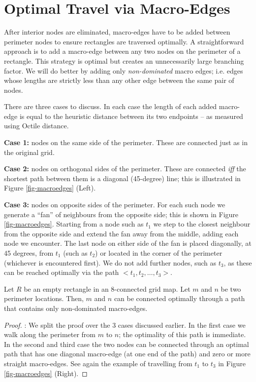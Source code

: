 \section{Optimal Travel via Macro-Edges}

After interior nodes are eliminated, macro-edges have to be added between perimeter
nodes to ensure rectangles are traversed optimally.
A straightforward approach is to add a macro-edge between any
two nodes on the perimeter of a rectangle. This strategy is optimal but creates
an unnecessarily large branching factor. 
We will do better by adding only \emph{non-dominated} macro edges; i.e. edges whose 
lengths are strictly less than any other edge between the same pair of nodes.
\par
There are three cases to discuss. In each case the length of each added macro-edge 
is equal to the heuristic distance between its two endpoints -- as measured
using Octile distance.
\par \noindent
\textbf{Case 1:} nodes on the same side of the perimeter. These are connected
just as in the original grid.
\par \noindent
\textbf{Case 2:} nodes on orthogonal sides of the perimeter.
These are connected \emph{iff} the shortest path between them is a diagonal
(45-degree) line; this is illustrated in Figure \ref{fig-macroedges} (Left).
\par \noindent
\textbf{Case 3:} nodes on opposite sides of the perimeter. 
For each such node we generate a ``fan'' of neighbours from the opposite side; this is shown in Figure
\ref{fig-macroedges}.
Starting from a node such as $t_{1}$ we step to the closest
neighbour from the opposite side and extend the fan away
from the middle, adding each node we encounter.  The last node
on either side of the fan is placed diagonally, at 45 degrees, from $t_{1}$
(such as $t_{2}$) or located in the corner of the perimeter (whichever is encountered first).  
We do not add further nodes, such as $t_{3}$, as
these can be reached optimally via the path $< t_1, t_2, \dots,
t_3 > $.

\begin{lemma} \label{lemma-rooms} Let $R$ be an empty rectangle in
an 8-connected grid map. Let $m$ and $n$ be two perimeter locations.
Then, $m$ and $n$ can be connected optimally through a path that
contains only non-dominated macro-edges.
\end{lemma}

\begin{proof}:
We split the proof over the 3 cases discussed earlier.
In the first case we walk along the perimeter from $m$ to $n$; the
optimality of this path is immediate. In the second and third case 
the two nodes can be connected through an optimal path that has one diagonal macro-edge
(at one end of the path) and zero or more straight macro-edges.
See again the example of travelling from $t_1$ to $t_3$ in Figure
\ref{fig-macroedges} (Right).
\end{proof}


